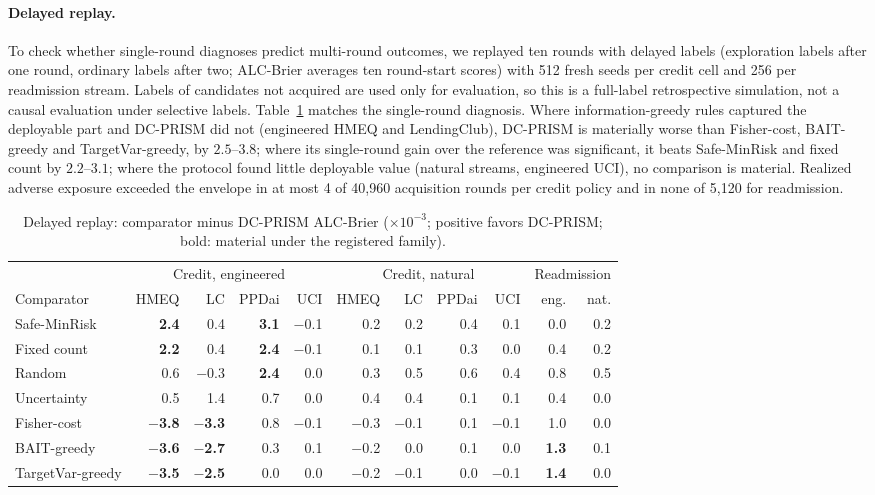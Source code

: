 \documentclass[runningheads]{llncs}
\begin{document}
\paragraph{Delayed replay.} To check whether single-round diagnoses predict multi-round outcomes, we replayed ten rounds with delayed labels (exploration labels after one round, ordinary labels after two; ALC-Brier averages ten round-start scores) with 512 fresh seeds per credit cell and 256 per readmission stream. Labels of candidates not acquired are used only for evaluation, so this is a full-label retrospective simulation, not a causal evaluation under selective labels. Table~\ref{tab:replay} matches the single-round diagnosis. Where information-greedy rules captured the deployable part and DC-PRISM did not (engineered HMEQ and LendingClub), DC-PRISM is materially worse than Fisher-cost, BAIT-greedy and TargetVar-greedy, by $2.5$--$3.8$; where its single-round gain over the reference was significant, it beats Safe-MinRisk and fixed count by $2.2$--$3.1$; where the protocol found little deployable value (natural streams, engineered UCI), no comparison is material. Realized adverse exposure exceeded the envelope in at most 4 of 40{,}960 acquisition rounds per credit policy and in none of 5{,}120 for readmission.

\begin{table}[t]
\caption{Delayed replay: comparator minus DC-PRISM ALC-Brier ($\times10^{-3}$; positive favors DC-PRISM; bold: material under the registered family).}
\label{tab:replay}
\centering\scriptsize
\setlength{\tabcolsep}{2.4pt}
\begin{tabular}{lrrrrrrrrrr}
\toprule
& \multicolumn{4}{c}{Credit, engineered} & \multicolumn{4}{c}{Credit, natural} & \multicolumn{2}{c}{Readmission} \\
\cmidrule(lr){2-5}\cmidrule(lr){6-9}\cmidrule(lr){10-11}
Comparator & HMEQ & LC & PPDai & UCI & HMEQ & LC & PPDai & UCI & eng. & nat. \\
\midrule
Safe-MinRisk & \textbf{2.4} & 0.4 & \textbf{3.1} & $-$0.1 & 0.2 & 0.2 & 0.4 & 0.1 & 0.0 & 0.2 \\
Fixed count & \textbf{2.2} & 0.4 & \textbf{2.4} & $-$0.1 & 0.1 & 0.1 & 0.3 & 0.0 & 0.4 & 0.2 \\
Random & 0.6 & $-$0.3 & \textbf{2.4} & 0.0 & 0.3 & 0.5 & 0.6 & 0.4 & 0.8 & 0.5 \\
Uncertainty & 0.5 & 1.4 & 0.7 & 0.0 & 0.4 & 0.4 & 0.1 & 0.1 & 0.4 & 0.0 \\
Fisher-cost & \textbf{$-$3.8} & \textbf{$-$3.3} & 0.8 & $-$0.1 & $-$0.3 & $-$0.1 & 0.1 & $-$0.1 & 1.0 & 0.0 \\
BAIT-greedy & \textbf{$-$3.6} & \textbf{$-$2.7} & 0.3 & 0.1 & $-$0.2 & 0.0 & 0.1 & 0.0 & \textbf{1.3} & 0.1 \\
TargetVar-greedy & \textbf{$-$3.5} & \textbf{$-$2.5} & 0.0 & 0.0 & $-$0.2 & $-$0.1 & 0.0 & $-$0.1 & \textbf{1.4} & 0.0 \\
\bottomrule
\end{tabular}
\end{table}
\end{document}
